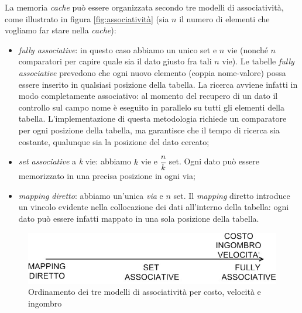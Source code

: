 La memoria \textit{cache} può essere organizzata secondo tre modelli di associatività, come illustrato in figura \ref{fig:associatività} (sia $n$ il numero di elementi che vogliamo far stare nella \textit{cache}):
\begin{itemize}
\item \textit{fully associative}: in questo caso abbiamo un unico set e $n$ vie (nonché $n$ comparatori per capire quale sia il dato giusto fra tali $n$ vie). Le tabelle \textit{fully associative} prevedono che ogni nuovo elemento (coppia nome-valore) possa essere inserito in qualsiasi posizione della tabella. La ricerca avviene infatti in modo completamente associativo: al momento del recupero di un dato il controllo sul campo nome è eseguito in parallelo su tutti gli elementi della tabella. L'implementazione di questa metodologia richiede un comparatore per ogni posizione della tabella, ma garantisce che il tempo di ricerca sia costante, qualunque sia la posizione del dato cercato;
\item \textit{set associative} a \textit{k} vie: abbiamo $k$ vie e $\dfrac{n}{k}$ set. Ogni dato può essere memorizzato in una precisa posizione in ogni via;
\item \textit{mapping diretto}: abbiamo un'unica \textit{via} e $n$ set. Il \textit{mapping} diretto introduce un vincolo evidente nella collocazione dei dati all'interno della tabella: ogni dato può essere infatti mappato in una sola posizione della tabella.
\end{itemize}

\begin{figure}[!h]
\centering
\includegraphics[width=0.75\columnwidth]{img/hitParadeCache}
\caption{Ordinamento dei tre modelli di associatività per costo, velocità e ingombro}
\label{fig:hitParadeCache}
\end{figure}

